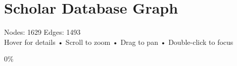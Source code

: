 \documentclass[12pt,a4paper]{article}
\begin{document}
\section{Scholar Database Graph}\label{scholar-database-graph}

Nodes: 1629 \textbar{} Edges: 1493\\
{Hover for details • Scroll to zoom • Drag to pan • Double-click to
focus}

\protect{}\label{mynetwork}

\protect{}\label{loadingBar}
\protect{}\label{text}
0\%

\protect{}\label{border}
\protect{}\label{bar}
\end{document}
